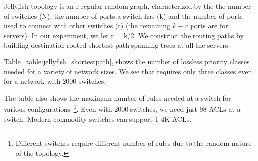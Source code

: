 \begin{table}[t]
	\centering
	\caption{Jellyfish with shortest paths.}
	\label{table:jellyfish_shortestpath}
\end{table}

Jellyfish topology is an r-regular random graph, characterized by the the number
of switches (N), the number of ports a switch has (k) and the number of ports
used to connect with other switches (r) (the remaining $k-r$ ports are for
servers). In our experiment, we let r = k/2.  We construct the routing paths by
building destination-rooted shortest-path spanning trees at all the servers.

Table~\ref{table:jellyfish_shortestpath}, shows the number of lossless priority
classes needed for a variety of network sizes. We see that \sysname{} requires
only three classes even for a network with 2000 switches.

The table also shows the maximum number of rules needed at a switch for various
configurations~\footnote{Different switches require different number of rules
due to the random nature of the topology.}. Even with 2000 switches, we need
just 98 ACLs at a switch. Modern commodity switches can support 1-4K ACLs.

